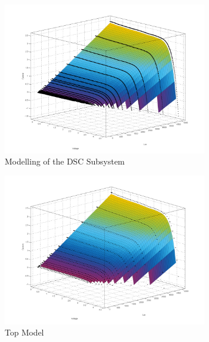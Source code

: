 \begin{figure}[H]
	  \begin{center}
		  \includegraphics[width=0.8\textwidth]{images/IVLUX_LAB_measured}
		  \caption{Modelling of the DSC Subsystem }
		  \label{fig:IVLUX_LAB_measured}
	  \end{center}
  \end{figure}

\begin{figure}[H]
  \begin{center}
	  \includegraphics[width=0.8\textwidth]{images/IVLUX_MOD_gen}
	  \caption{Top Model }
	  \label{fig:IVLUX_MOD_gen}
  \end{center}
\end{figure}

